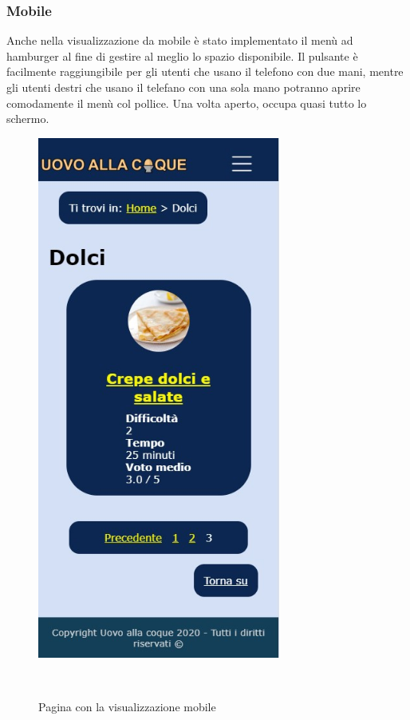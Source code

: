 \subsubsection{Mobile}
\label{ssub:mobile}
Anche nella visualizzazione da mobile è stato implementato il menù ad hamburger al fine di gestire al meglio lo spazio disponibile. Il pulsante è facilmente raggiungibile per gli utenti che usano il telefono con due mani, mentre gli utenti destri che usano il telefano con una sola mano potranno aprire comodamente il menù col pollice. Una volta aperto, occupa quasi tutto lo schermo.
\begin{figure}[H]
	\begin{minipage}[b]{8.5cm}
		\centering
		\includegraphics[width=8cm]{img/progettazione/mobile.jpg}
		\caption{Pagina con la visualizzazione mobile}
	\end{minipage}
	\ \hspace{2mm} \hspace{3mm} \
	\begin{minipage}[b]{8.5cm}

\end{minipage}
\end{figure}
